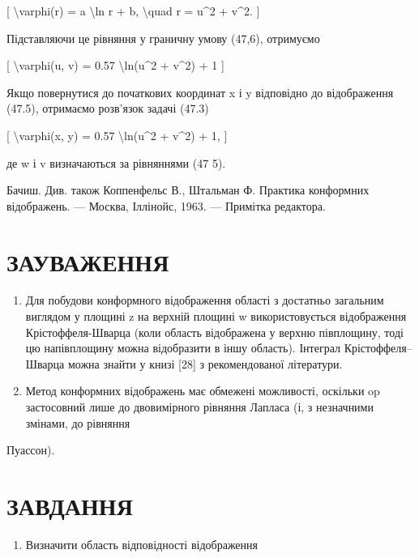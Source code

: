 \documentclass[
]{article}
\providecommand{\tightlist}{%
  \setlength{\itemsep}{0pt}\setlength{\parskip}{0pt}}
\begin{document}
{[} \textbackslash varphi(r) = a \textbackslash ln r + b,
\textbackslash quad r = u\^{}2 + v\^{}2. {]}

Підставляючи це рівняння у граничну умову (47,6), отримуємо

{[} \textbackslash varphi(u, v) = 0.57 \textbackslash ln(u\^{}2 +
v\^{}2) + 1 {]}

Якщо повернутися до початкових координат x і y відповідно до
відображення (47.5), отримаємо розв'язок задачі (47.3)

{[} \textbackslash varphi(x, y) = 0.57 \textbackslash ln(u\^{}2 +
v\^{}2) + 1, {]}

де w і v визначаються за рівняннями (47 5).

Бачиш. Див. також Коппенфельс В., Штальман Ф. Практика конформних
відображень. --- Москва, Іллінойс, 1963. --- Примітка редактора.

\section{ЗАУВАЖЕННЯ}\label{ux437ux430ux443ux432ux430ux436ux435ux43dux43dux44f-8}

\begin{enumerate}
\def\labelenumi{\arabic{enumi}.}
\item
  Для побудови конформного відображення області з достатньо загальним
  виглядом у площині z на верхній площині w використовується
  відображення Крістоффеля-Шварца (коли область відображена у верхню
  півплощину, тоді цю напівплощину можна відобразити в іншу область).
  Інтеграл Крістоффеля--Шварца можна знайти у книзі {[}28{]} з
  рекомендованої літератури.
\item
  Метод конформних відображень має обмежені можливості, оскільки op
  застосовний лише до двовимірного рівняння Лапласа (і, з незначними
  змінами, до рівняння
\end{enumerate}

Пуассон).

\section{ЗАВДАННЯ}\label{ux437ux430ux432ux434ux430ux43dux43dux44f-11}

\begin{enumerate}
\def\labelenumi{\arabic{enumi}.}
\tightlist
\item
  Визначити область відповідності відображення
\end{enumerate}
\end{document}
